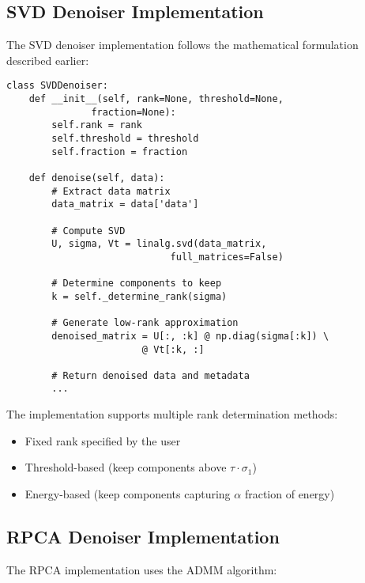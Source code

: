\documentclass[11pt]{article}
\begin{document}
\subsection{SVD Denoiser Implementation}
The SVD denoiser implementation follows the mathematical formulation described earlier:

\begin{lstlisting}
class SVDDenoiser:
    def __init__(self, rank=None, threshold=None, 
               fraction=None):
        self.rank = rank
        self.threshold = threshold
        self.fraction = fraction
        
    def denoise(self, data):
        # Extract data matrix
        data_matrix = data['data']
        
        # Compute SVD
        U, sigma, Vt = linalg.svd(data_matrix, 
                             full_matrices=False)
        
        # Determine components to keep
        k = self._determine_rank(sigma)
        
        # Generate low-rank approximation
        denoised_matrix = U[:, :k] @ np.diag(sigma[:k]) \
                        @ Vt[:k, :]
                        
        # Return denoised data and metadata
        ...
\end{lstlisting}

The implementation supports multiple rank determination methods:
\begin{itemize}
\item Fixed rank specified by the user
\item Threshold-based (keep components above $\tau \cdot \sigma_1$)
\item Energy-based (keep components capturing $\alpha$ fraction of energy)
\end{itemize}

\subsection{RPCA Denoiser Implementation}
The RPCA implementation uses the ADMM algorithm:
\end{document}
